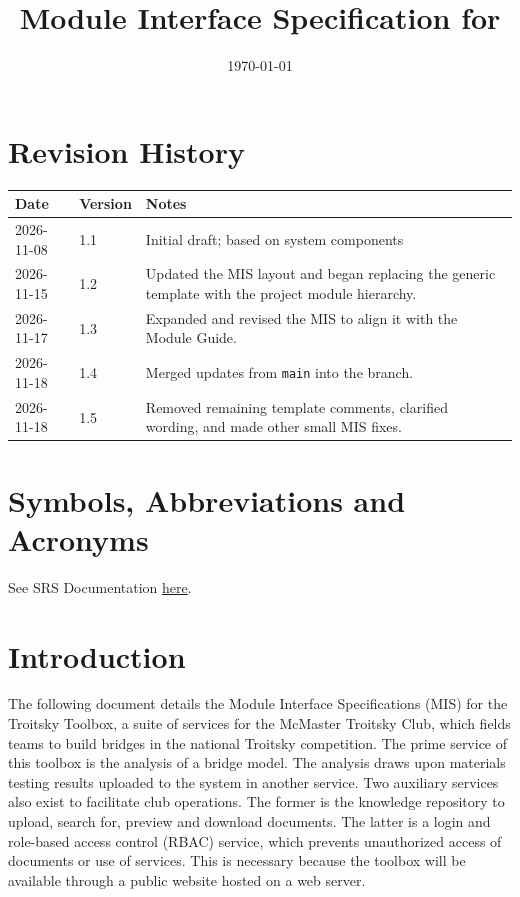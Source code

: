 \documentclass[12pt, titlepage]{article}
\begin{document}
\title{Module Interface Specification for \progname{}}

\author{\authname}

\date{\today}

\maketitle


\section{Revision History}

\begin{tabularx}{\textwidth}{p{3cm}p{2cm}X}
\toprule
\textbf{Date} & \textbf{Version} & \textbf{Notes} \\
\midrule
2026-11-08 & 1.1 & Initial draft; based on system components \\
2026-11-15 & 1.2 & Updated the MIS layout and began replacing the generic template with the project module hierarchy. \\
2026-11-17 & 1.3 & Expanded and revised the MIS to align it with the Module Guide. \\
2026-11-18 & 1.4 & Merged updates from \texttt{main} into the branch. \\
2026-11-18 & 1.5 & Removed remaining template comments, clarified wording, and made other small MIS fixes. \\
\bottomrule
\end{tabularx}

\newpage

\section{Symbols, Abbreviations and Acronyms}

See SRS Documentation \href{https://github.com/JackEaston4/Troitsky-Toolbox/blob/main/pdfs/SRS/SRS.pdf}{here}.

\newpage

\tableofcontents

\newpage


\section{Introduction}

The following document details the Module Interface Specifications (MIS) for the Troitsky Toolbox,
a suite of services for the McMaster Troitsky Club, which fields teams to build bridges in the
national Troitsky competition. The prime service of this toolbox is the analysis of a bridge model.
The analysis draws upon materials testing results uploaded to the system in another service. Two auxiliary
services also exist to facilitate club operations. The former is the knowledge repository to upload,
search for, preview and download documents. The latter is a login and role-based access control (RBAC) service,
which prevents unauthorized access of documents or use of services. This is necessary because the toolbox
will be available through a public website hosted on a web server.
\end{document}
